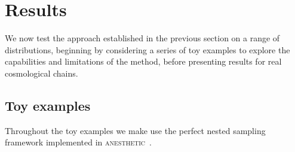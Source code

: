 \documentclass[usenatbib]{mnras}
\providecommand{\DIFaddtex}[1]{{\protect\color{blue}\uwave{#1}}} %
\providecommand{\DIFaddbegin}{} %
\providecommand{\DIFaddend}{} %
\providecommand{\DIFadd}[1]{\texorpdfstring{\DIFaddtex{#1}}{#1}} %
\newcommand{\DIFaddincludegraphics}[2][]{{\color{blue}\fbox{\DIFOincludegraphics[#1]{#2}}}} %
\DeclareRobustCommand{\DIFaddbegin}{\DIFOaddbegin \let\includegraphics\DIFaddincludegraphics} %
\DeclareRobustCommand{\DIFaddend}{\DIFOaddend \let\includegraphics\DIFOincludegraphics} %
\begin{document}
\section{Results}\label{sec:results}
We now test the approach established in the previous section on a range of distributions, beginning by considering a series of toy examples to explore the capabilities and limitations of the method, before presenting results for real cosmological chains.
\subsection{Toy examples}\label{sec:logXfs_toy}
Throughout the toy examples we make use \DIFaddbegin \DIFadd{of }\DIFaddend the perfect nested sampling~\citep{Keeton_2011,2018BayAn..13..873H} framework implemented in \textsc{anesthetic}~\citep{anesthetic}.
\end{document}
